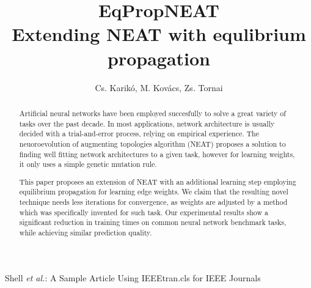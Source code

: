 \documentclass[lettersize,journal]{IEEEtran}
\begin{document}
\title{EqPropNEAT\\Extending NEAT with equlibrium propagation}

\author{Cs. Karikó, M. Kovács, Zs. Tornai
}

%
{Shell \MakeLowercase{\textit{et al.}}: A Sample Article Using IEEEtran.cls for IEEE Journals}


\maketitle

\begin{abstract}
  Artificial neural networks have been employed succesfully to solve a great variety of tasks over the past decade. In most applications, network architecture is usually decided with a trial-and-error process, relying on empirical experience.
  The neuoroevolution of augmenting topologies algorithm (NEAT) proposes a solution to finding well fitting network architectures to a given task, however for learning weights, it only uses a simple genetic mutation rule.

  This paper proposes an extension of NEAT with an additional learning step employing equilibrium propagation for learning edge weights. We claim that the resulting novel technique needs less iterations for convergence, as weights are adjusted by a method which was specifically invented for such task. Our experimental results show a significant reduction in training times on common neural network benchmark tasks, while achieving similar prediction quality.
\end{abstract}

\end{document}

